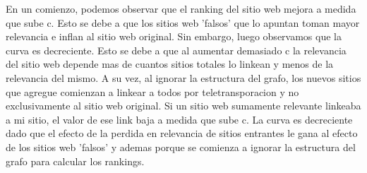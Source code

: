 En un comienzo, podemos observar que el ranking del sitio web mejora a medida que sube c. Esto se debe a que los sitios web 'falsos' que lo apuntan toman mayor relevancia e inflan al sitio web original. Sin embargo, luego observamos que la curva es decreciente. Esto se debe a que al aumentar demasiado c la relevancia del sitio web depende mas de cuantos sitios totales lo linkean y menos de la relevancia del mismo. A su vez, al ignorar la estructura del grafo, los nuevos sitios que agregue comienzan a linkear a todos por teletransporacion y no exclusivamente al sitio web original. Si un sitio web sumamente relevante linkeaba a mi sitio, el valor de ese link baja a medida que sube c. La curva es decreciente dado que el efecto de la perdida en relevancia de sitios entrantes le gana al efecto de los sitios web 'falsos' y ademas porque se comienza a ignorar la estructura del grafo para calcular los rankings.

\pagebreak
